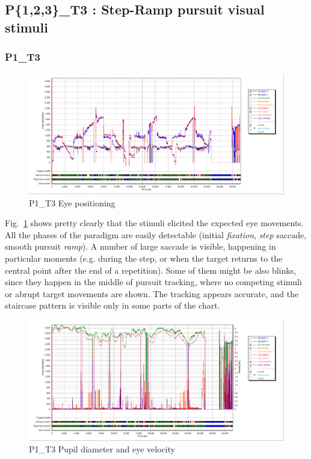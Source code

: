 \subsection{P\{1,2,3\}\_T3 : Step-Ramp pursuit visual stimuli}
\label{sec:P123_T3}

\subsubsection{P1\_T3}
\label{sec:P1_T3}

\begin{figure}[h]
  \centering
  \includegraphics[width=.8\textwidth]{figures/graphs/P1_T3(stepRamp)_XY.png}
  \caption[P1\_T3 Eye positioning]{P1\_T3 Eye positioning}
  \label{fig:P1_T3_pos}
\end{figure}

Fig.~\ref{fig:P1_T3_pos} shows pretty clearly that the stimuli elicited the expected eye movements. All the phases of the paradigm are easily detectable (initial \textit{fixation}, \textit{step} saccade, smooth pursuit \textit{ramp}). A number of large saccade is visible, happening in particular moments (e.g. during the step, or when the target returns to the central point after the end of a repetition). Some of them might be also blinks, since they happen in the middle of pursuit tracking, where no competing stimuli or abrupt target movements are shown. The tracking appears accurate, and the staircase pattern is visible only in some parts of the chart.

\begin{figure}[h]
  \centering
  \includegraphics[width=.8\textwidth]{figures/graphs/P1_T3(stepRamp)_VP.png}
  \caption[P1\_T3 pupil velocity]{P1\_T3 Pupil diameter and eye velocity}
  \label{fig:P1_T3_vel}
\end{figure}

